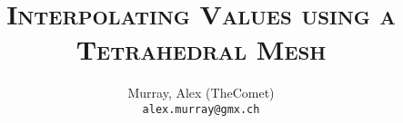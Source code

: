 \author{%
    Murray, Alex (TheComet)\\
    \texttt{alex.murray@gmx.ch}
}

\title{%
    \Huge{\textsc{Interpolating Values using a Tetrahedral Mesh}} \\
    \vspace{5mm}
}

